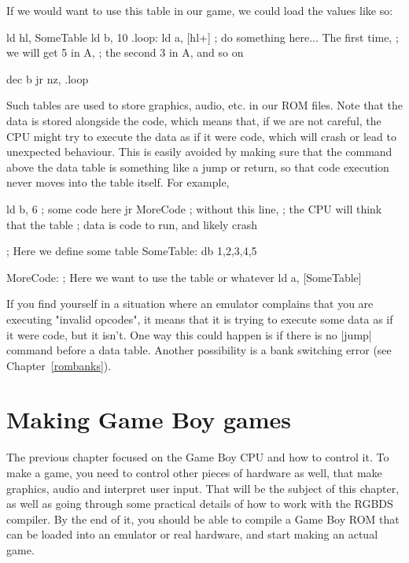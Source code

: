 \documentclass[11pt]{book}
\begin{document}
If we would want to use this table in our game, we could load the values like so:

\begin{code}
ld hl, SomeTable
ld b, 10
.loop:
    ld a, [hl+]
    ; do something here... The first time, 
    ; we will get 5 in A, 
    ; the second 3 in A, and so on
    
    dec b
    jr nz, .loop
\end{code}

Such tables are used to store graphics, audio, etc. in our ROM files. Note that the data is stored alongside the code, which means that, if we are not careful, the CPU might try to execute the data as if it were code, which will crash or lead to unexpected behaviour. This is easily avoided by making sure that the command above the data table is something like a jump or return, so that code execution never moves into the table itself. For example, 

\begin{code}
    ld b, 6 ; some code here
    jr MoreCode ; without this line, 
    ; the CPU will think that the table
    ; data is code to run, and likely crash 

; Here we define some table 
SomeTable:
    db 1,2,3,4,5

MoreCode:
    ; Here we want to use the table or whatever 
    ld a, [SomeTable]
\end{code}

If you find yourself in a situation where an emulator complains that you are executing "invalid opcodes", it means that it is trying to execute some data as if it were code, but it isn't. One way this could happen is if there is no |jump| command before a data table. Another possibility is a bank switching error (see Chapter~\ref{rombanks}).

\chapter{Making Game Boy games}
\label{gbgames}
The previous chapter focused on the Game Boy CPU and how to control it. To make a game, you need to control other pieces of hardware as well, that make graphics, audio and interpret user input. That will be the subject of this chapter, as well as going through some practical details of how to work with the RGBDS compiler. By the end of it, you should be able to compile a Game Boy ROM that can be loaded into an emulator or real hardware, and start making an actual game.
\end{document}
